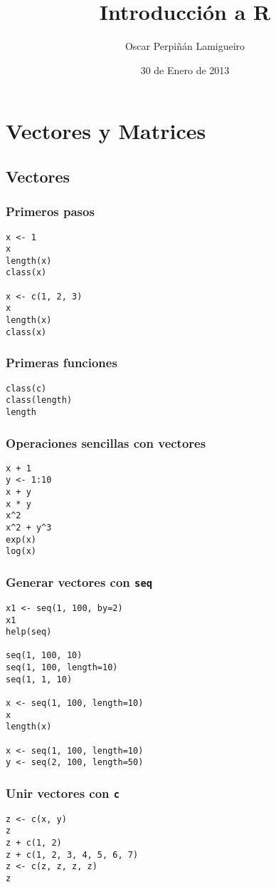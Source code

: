 \documentclass{beamer}
\title{Introducción a R}
\author{Oscar Perpiñán Lamigueiro}
\date{30 de Enero de 2013}
\begin{document}
\maketitle



\section{Vectores y Matrices}
\label{sec-1}
\subsection{Vectores}
\label{sec-1-1}
\begin{frame}[fragile]
\frametitle{Primeros pasos}
\label{sec-1-1-1}


\lstset{language=R}
\begin{lstlisting}
x <- 1
x
length(x)
class(x)

x <- c(1, 2, 3)
x
length(x)
class(x)
\end{lstlisting}
\end{frame}
\begin{frame}[fragile]
\frametitle{Primeras funciones}
\label{sec-1-1-2}


\lstset{language=R}
\begin{lstlisting}
class(c)
class(length)
length
\end{lstlisting}
\end{frame}
\begin{frame}[fragile]
\frametitle{Operaciones sencillas con vectores}
\label{sec-1-1-3}


\lstset{language=R}
\begin{lstlisting}
x + 1
y <- 1:10
x + y
x * y
x^2
x^2 + y^3
exp(x)
log(x)
\end{lstlisting}
\end{frame}
\begin{frame}[fragile]
\frametitle{Generar vectores con \texttt{seq}}
\label{sec-1-1-4}


\lstset{language=R}
\begin{lstlisting}
x1 <- seq(1, 100, by=2)
x1
help(seq)

seq(1, 100, 10)
seq(1, 100, length=10)
seq(1, 1, 10)

x <- seq(1, 100, length=10)
x
length(x)

x <- seq(1, 100, length=10)
y <- seq(2, 100, length=50)
\end{lstlisting}
\end{frame}
\begin{frame}[fragile]
\frametitle{Unir vectores con \texttt{c}}
\label{sec-1-1-5}


\lstset{language=R}
\begin{lstlisting}
z <- c(x, y)
z
z + c(1, 2)
z + c(1, 2, 3, 4, 5, 6, 7)
z <- c(z, z, z, z)
z
\end{lstlisting}
\end{frame}
\end{document}
